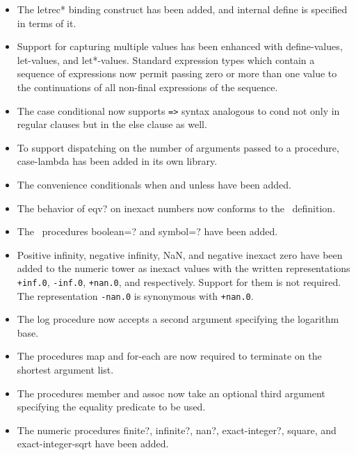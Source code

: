 \begin{itemize}
\item The {\cf letrec*} binding construct has been added, and internal {\cf define} 
is specified in terms of it.

\item Support for capturing multiple values has been enhanced with {\cf
define-values}, {\cf let-values}, and {\cf let*-values}.
Standard expression types which contain a sequence of expressions now
permit passing zero or more than one value to the continuations of all
non-final expressions of the sequence.

\item The {\cf case} conditional now supports {\tt =>} syntax
analogous to {\cf cond} not only in regular clauses but in the {\cf
else} clause as well.

\item To support dispatching on the number of arguments passed to a
procedure, {\cf case-lambda} has been added in its own library.

\item The convenience conditionals {\cf when} and {\cf unless} have been added.

\item The behavior of {\cf eqv?} on inexact numbers now conforms to the
\rsixrs\ definition.

\item The \rsixrs\ procedures {\cf boolean=?} and {\cf symbol=?} have been added.

\item Positive infinity, negative infinity, NaN, and negative inexact zero have been added
to the numeric tower as inexact values with the written
representations {\tt +inf.0}, {\tt -inf.0}, {\tt +nan.0}, and {}
respectively.  Support for them is not required.
The representation {\tt -nan.0} is synonymous with {\tt +nan.0}.

\item The {\cf log} procedure now accepts a second argument specifying
the logarithm base.

\item The procedures {\cf map} and {\cf for-each} are now required to terminate on
the shortest argument list.

\item The procedures {\cf member} and {\cf assoc} now take an optional third argument
specifying the equality predicate to be used.

\item The numeric procedures {\cf finite?}, {\cf infinite?}, {\cf nan?},
{\cf exact-integer?}, {\cf square}, and {\cf exact-integer-sqrt}
have been added.


\end{itemize}

